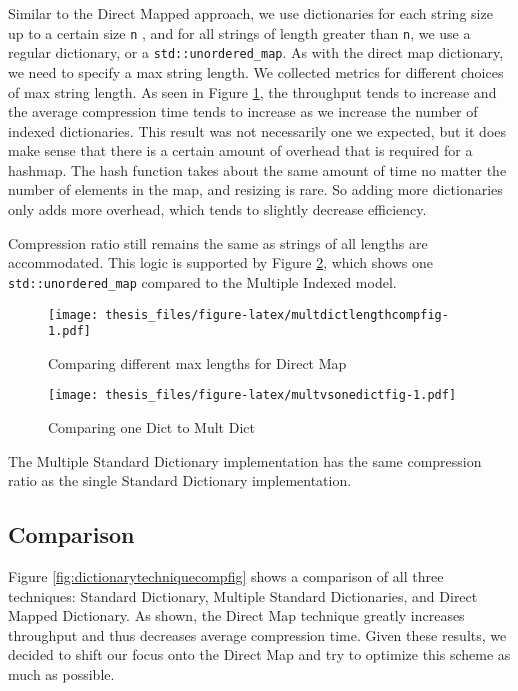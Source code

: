 \documentclass[12pt,twoside]{reedthesis}
\begin{document}
Similar to the Direct Mapped approach, we use dictionaries for each string size up to a certain size \texttt{n} , and for all strings of length greater than \texttt{n}, we use a regular dictionary, or a \texttt{std::unordered\_map}. As with the direct map dictionary, we need to specify a max string length. We collected metrics for different choices of max string length. As seen in Figure \ref{fig:multdictlengthcompfig}, the throughput tends to increase and the average compression time tends to increase as we increase the number of indexed dictionaries. This result was not necessarily one we expected, but it does make sense that there is a certain amount of overhead that is required for a hashmap. The hash function takes about the same amount of time no matter the number of elements in the map, and resizing is rare. So adding more dictionaries only adds more overhead, which tends to slightly decrease efficiency.

Compression ratio still remains the same as strings of all lengths are accommodated.
This logic is supported by Figure \ref{fig:multvsonedictfig}, which shows one \texttt{std::unordered\_map} compared to the Multiple Indexed model.
\begin{figure}
\centering
\texttt{[image: thesis\_files/figure-latex/multdictlengthcompfig-1.pdf]}
\caption{\label{fig:multdictlengthcompfig}Comparing different max lengths for Direct Map}
\end{figure}
\begin{figure}
\centering
\texttt{[image: thesis\_files/figure-latex/multvsonedictfig-1.pdf]}
\caption{\label{fig:multvsonedictfig}Comparing one Dict to Mult Dict}
\end{figure}
The Multiple Standard Dictionary implementation has the same compression ratio as the single Standard Dictionary implementation.

\hypertarget{comparison-1}{%
\subsection{Comparison}\label{comparison-1}}

Figure \ref{fig:dictionarytechniquecompfig} shows a comparison of all three techniques: Standard Dictionary, Multiple Standard Dictionaries, and Direct Mapped Dictionary. As shown, the Direct Map technique greatly increases throughput and thus decreases average compression time. Given these results, we decided to shift our focus onto the Direct Map and try to optimize this scheme as much as possible.
\end{document}
